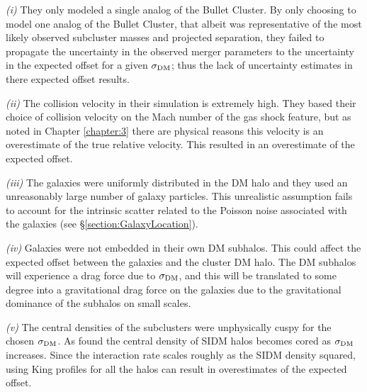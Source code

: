 \textit{(i)} They only modeled a single analog of the Bullet Cluster. 
By only choosing to model one analog of the Bullet Cluster, that albeit was representative of the most likely observed subcluster masses and projected separation, they failed to propagate the uncertainty in the observed merger parameters to the uncertainty in the expected offset for a given $\sigma_{\rm DM}$; thus the lack of uncertainty estimates in there expected offset results.

\textit{(ii)} The collision velocity in their simulation is extremely high.
They based their choice of collision velocity on the Mach number of the gas shock feature, but as noted in Chapter \ref{chapter:3} there are physical reasons this velocity is an overestimate of the true relative velocity.
This resulted in an overestimate of the expected offset.
	
\textit{(iii)} The galaxies were uniformly distributed in the DM halo and they used an unreasonably large number of galaxy particles. 
This unrealistic assumption fails to account for the intrinsic scatter related to the Poisson noise associated with the galaxies (see \S\ref{section:GalaxyLocation}).

\textit{(iv)} Galaxies were not embedded in their own DM subhalos.
This could affect the expected offset between the galaxies and the cluster DM halo. The DM subhalos will experience a drag force due to  $\sigma_{\rm DM}$, and this will be translated to some degree into a gravitational drag force on the galaxies due to the gravitational dominance of the subhalos on small scales. 

\textit{(v)} The central densities of the subclusters were unphysically cuspy for the chosen $\sigma_{\rm DM}$.
As \citet{Rocha:2012tr} found the central density of SIDM halos becomes cored as $\sigma_{\rm DM}$ increases.
Since the interaction rate scales roughly as the SIDM density squared, using King profiles for all the halos can result in overestimates of the expected offset. 

